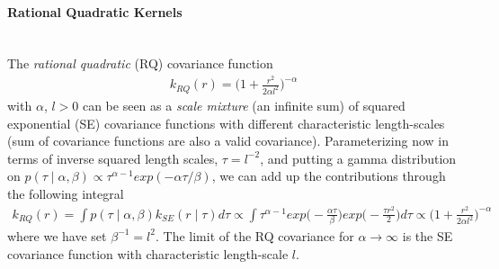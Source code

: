 \documentclass[11pt]{article}
\begin{document}
\paragraph{Rational Quadratic Kernels}\mbox{}\\
The \textsl{rational quadratic} (RQ) covariance function
\begin{align*}
k_{RQ}(r)=\Big(1+\frac{r^2}{2\alpha l^2}\Big)^{-\alpha}
\end{align*}
with $\alpha$, $l>0$ can be seen as a \textsl{scale mixture} (an infinite sum) of squared exponential (SE) covariance functions with different characteristic length-scales (sum of covariance functions are also a valid covariance). Parameterizing now in terms of inverse squared length scales, $\tau=l^{-2}$, and putting a gamma distribution on $p(\tau\mid \alpha, \beta)\propto \tau^{\alpha-1} exp(-\alpha \tau/\beta)$, we can add up the contributions through the following integral
\begin{align*}
k_{RQ}(r)=\int p(\tau\mid \alpha, \beta)k_{SE}(r\mid \tau)d\tau \propto \int \tau^{\alpha-1} exp\Big(-\frac{\alpha \tau}{\beta}\Big)exp\Big(-\frac{\tau r^2}{2}\Big)d\tau \propto \Big(1+\frac{r^2}{2\alpha l^2}\Big)^{-\alpha}
\end{align*}
where we have set $\beta^{-1}=l^2$. The limit of the RQ covariance for $\alpha \rightarrow \infty$ is the SE covariance function with characteristic length-scale $l$. 
\end{document}
